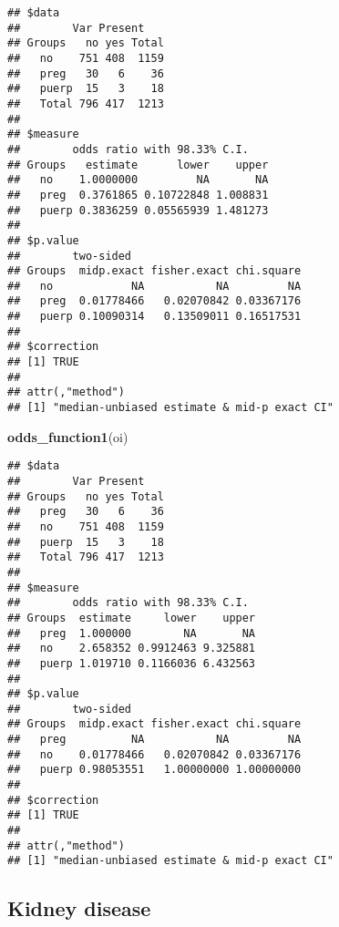 \documentclass[
]{article}
\newenvironment{Shaded}{\begin{snugshade}}{\end{snugshade}}
\newcommand{\KeywordTok}[1]{\textcolor[rgb]{0.13,0.29,0.53}{\textbf{#1}}}
\newcommand{\NormalTok}[1]{#1}
\newcommand{\OperatorTok}[1]{\textcolor[rgb]{0.81,0.36,0.00}{\textbf{#1}}}
\newcommand{\StringTok}[1]{\textcolor[rgb]{0.31,0.60,0.02}{#1}}
\begin{document}
\begin{Shaded}
\end{Shaded}

\begin{verbatim}
## $data
##        Var Present
## Groups   no yes Total
##   no    751 408  1159
##   preg   30   6    36
##   puerp  15   3    18
##   Total 796 417  1213
## 
## $measure
##        odds ratio with 98.33% C.I.
## Groups   estimate      lower    upper
##   no    1.0000000         NA       NA
##   preg  0.3761865 0.10722848 1.008831
##   puerp 0.3836259 0.05565939 1.481273
## 
## $p.value
##        two-sided
## Groups  midp.exact fisher.exact chi.square
##   no            NA           NA         NA
##   preg  0.01778466   0.02070842 0.03367176
##   puerp 0.10090314   0.13509011 0.16517531
## 
## $correction
## [1] TRUE
## 
## attr(,"method")
## [1] "median-unbiased estimate & mid-p exact CI"
\end{verbatim}

\begin{Shaded}
\begin{Highlighting}[]
\KeywordTok{odds_function1}\NormalTok{(oi)}
\end{Highlighting}
\end{Shaded}

\begin{verbatim}
## $data
##        Var Present
## Groups   no yes Total
##   preg   30   6    36
##   no    751 408  1159
##   puerp  15   3    18
##   Total 796 417  1213
## 
## $measure
##        odds ratio with 98.33% C.I.
## Groups  estimate     lower    upper
##   preg  1.000000        NA       NA
##   no    2.658352 0.9912463 9.325881
##   puerp 1.019710 0.1166036 6.432563
## 
## $p.value
##        two-sided
## Groups  midp.exact fisher.exact chi.square
##   preg          NA           NA         NA
##   no    0.01778466   0.02070842 0.03367176
##   puerp 0.98053551   1.00000000 1.00000000
## 
## $correction
## [1] TRUE
## 
## attr(,"method")
## [1] "median-unbiased estimate & mid-p exact CI"
\end{verbatim}

\hypertarget{kidney-disease}{%
\subsection{Kidney disease}\label{kidney-disease}}
\end{document}
